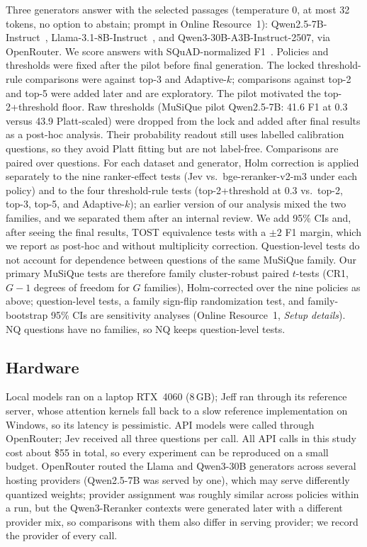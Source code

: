 Three generators answer with the selected passages (temperature 0, at most 32 tokens, no option to abstain; prompt in Online Resource~1): Qwen2.5-7B-Instruct~\cite{qwen25}, Llama-3.1-8B-Instruct~\cite{llama3}, and Qwen3-30B-A3B-Instruct-2507, via OpenRouter. We score answers with SQuAD-normalized F1~\cite{rajpurkar2016squad}.
Policies and thresholds were fixed after the pilot before final generation. The locked threshold-rule comparisons were against top-3 and Adaptive-$k$; comparisons against top-2 and top-5 were added later and are exploratory. The pilot motivated the top-2+threshold floor. Raw thresholds (MuSiQue pilot Qwen2.5-7B: 41.6 F1 at 0.3 versus 43.9 Platt-scaled) were dropped from the lock and added after final results as a post-hoc analysis. Their probability readout still uses labelled calibration questions, so they avoid Platt fitting but are not label-free.
Comparisons are paired over questions. For each dataset and generator, Holm correction is applied separately to the nine ranker-effect tests (Jev vs.\ bge-reranker-v2-m3 under each policy) and to the four threshold-rule tests (top-2+threshold at 0.3 vs.\ top-2, top-3, top-5, and Adaptive-$k$); an earlier version of our analysis mixed the two families, and we separated them after an internal review. We add 95\% CIs and, after seeing the final results, TOST equivalence tests with a $\pm2$ F1 margin, which we report as post-hoc and without multiplicity correction.
Question-level tests do not account for dependence between questions of the same MuSiQue family. Our primary MuSiQue tests are therefore family cluster-robust paired $t$-tests (CR1, $G-1$ degrees of freedom for $G$ families), Holm-corrected over the nine policies as above; question-level tests, a family sign-flip randomization test, and family-bootstrap 95\% CIs are sensitivity analyses (Online Resource~1, \emph{Setup details}). NQ questions have no families, so NQ keeps question-level tests.

\subsection{Hardware}

Local models ran on a laptop RTX~4060 (8\,GB); Jeff ran through its reference server, whose attention kernels fall back to a slow reference implementation on Windows, so its latency is pessimistic.
API models were called through OpenRouter; Jev received all three questions per call. All API calls in this study cost about \$55 in total, so every experiment can be reproduced on a small budget.
OpenRouter routed the Llama and Qwen3-30B generators across several hosting providers (Qwen2.5-7B was served by one), which may serve differently quantized weights; provider assignment was roughly similar across policies within a run, but the Qwen3-Reranker contexts were generated later with a different provider mix, so comparisons with them also differ in serving provider; we record the provider of every call.

